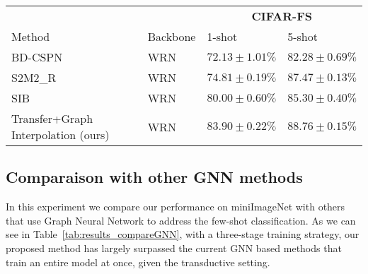 \documentclass[a4paper,conference]{IEEEtran}
\begin{document}
\begin{table*}
{\begin{tabular}{l|l|l|l}
         \toprule
         &          & \multicolumn{2}{c}{\textbf{CIFAR-FS}} \\
         Method & Backbone & 1-shot & 5-shot \\
         \midrule
BD-CSPN~\cite{liu2019prototype} & WRN & $72.13\pm1.01\%$ & $82.28\pm0.69\%$\\
         S2M2\_R~\cite{mangla2020charting} & WRN & $74.81\pm0.19\%$ & $87.47\pm0.13\%$\\
         SIB~\cite{hu2020empirical} & WRN & $80.00\pm0.60\%$ & $85.30\pm0.40\%$\\
         Transfer+Graph Interpolation (ours) & WRN & $\mathbf{83.90\pm0.22\%}$ & $\mathbf{88.76\pm0.15\%}$\\
         \bottomrule
         
    \end{tabular}
    }
    \label{tab:results}
\end{table*}

\subsection{Comparaison with other GNN methods}

In this experiment we compare our performance on miniImageNet with others that use Graph Neural Network to address the few-shot classification. As we can see in Table~\ref{tab:results_compareGNN}, with a three-stage training strategy, our proposed method has largely surpassed the current GNN based methods that train an entire model at once, given the transductive setting. 

\begin{table}
    \caption{1-shot and 5-shot performance (on miniImageNet) comparison with other GNN based methods. In our experiment we use the same hyperparameters as Table~\ref{tab:results}.}
    \centering

    \label{tab:results_compareGNN}
\end{table}
\end{document}
